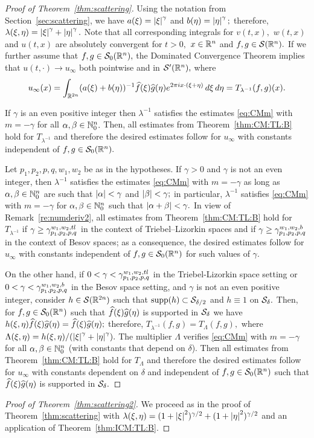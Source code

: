  
 \begin{proof}[Proof of Theorem~\ref{thm:scattering}] Using the notation from Section~\ref{sec:scattering},  we have $a(\xi)=\left\vert \xi \right\vert^\gamma$ and $b(\eta)=\left\vert \eta \right\vert^\gamma;$ therefore, $\lambda(\xi,\eta)=\left\vert \xi \right\vert^\gamma+\left\vert \eta \right\vert^\gamma.$ Note that all corresponding integrals for $v(t,x),$ $w(t,x)$ and $u(t,x)$ are absolutely convergent for $t>0,$ $x\in{{\mathbb R}^n}$ and $f,g\in {\mathcal{S}}({{\mathbb R}^n}).$ If we further assume that $f,g\in {\mathcal{S}_0}({{\mathbb R}^n}),$ the Dominated Convergence Theorem implies that $u(t,\cdot)\to u_\infty$  both pointwise and in ${\mathcal{S}'}({{\mathbb R}^n}),$ where
$$
u_\infty(x)=\int_{\mathbb{R}^{2n}} (a(\xi)+b(\eta))^{-1}\widehat{f}(\xi)\widehat{g}(\eta)e^{2\pi i x \cdot (\xi + \eta)}\, d\xi\, d\eta=T_{\lambda^{-1}} (f,g)(x).
$$

If $\gamma$ is an even positive integer then $\lambda^{-1}$ satisfies the estimates \eqref{eq:CMm} with $m=-\gamma$ for all $\alpha,\beta\in\mathbb{N}_0^n.$ Then,  all estimates from Theorem~\ref{thm:CM:TL:B} hold for $T_{\lambda^{-1}}$  and therefore the desired estimates follow for $u_\infty$ with constants independent of $f,g\in{\mathcal{S}_0}({{\mathbb R}^n}).$ 

Let $p_1,p_2,p,q, w_1,w_2$ be as in the hypotheses.  If $\gamma>0$ and $\gamma$ is not an even integer, then $\lambda^{-1}$ satisfies the estimates \eqref{eq:CMm} with $m=-\gamma$ as long as  $\alpha,\beta\in\mathbb{N}_0^n$ are such that $\left\vert \alpha \right\vert<\gamma$ and $\left\vert \beta \right\vert<\gamma;$ in particular, $\lambda^{-1}$ satisfies \eqref{eq:CMm} with $m=-\gamma$ for $\alpha,\beta\in \mathbb{N}_0^n$ such that $\left\vert \alpha+\beta \right\vert<\gamma.$
In view of Remark~\ref{re:numderiv2}, all estimates from Theorem~\ref{thm:CM:TL:B} hold for $T_{\lambda^{-1}}$ if $\gamma\ge \gamma_{p_1,p_2,p,q}^{w_1,w_2, tl}$ in the context of Triebel--Lizorkin spaces and if $\gamma\ge \gamma_{p_1,p_2,p,q}^{w_1,w_2,b}$ in the context of Besov spaces; as a consequence, the desired estimates follow for $u_\infty$ with constants independent of $f,g\in{\mathcal{S}_0}({{\mathbb R}^n})$ for such values of $\gamma.$


On the other hand, if $0<\gamma<\gamma_{p_1,p_2,p,q}^{w_1,w_2, tl}$ in the Triebel-Lizorkin space setting or $0<\gamma<\gamma_{p_1,p_2,p,q}^{w_1,w_2,b}$ in the Besov space setting, and $\gamma$ is not an even positive integer, consider  $h\in\mathcal{S}(\mathbb{R}^{2n}) $ such that ${\rm{supp}}(h)\subset \mathcal{S}_{\delta/2}$ and $h\equiv 1$ on $\mathcal{S}_{\delta}.$ Then, for $f,g\in {\mathcal{S}_0}({{\mathbb R}^n})$ such that $\widehat{f}(\xi)\widehat{g}(\eta)$ is supported in $\mathcal{S}_{\delta}$ we have $h(\xi,\eta)\widehat{f}(\xi)\widehat{g}(\eta)=\widehat{f}(\xi)\widehat{g}(\eta);$   therefore, $T_{\lambda^{-1}}(f,g)=T_{\Lambda}(f,g),$ where
$\Lambda(\xi,\eta)=h(\xi,\eta)/(\left\vert \xi \right\vert^\gamma+\left\vert \eta \right\vert^\gamma).$ The multiplier $\Lambda$ verifies  \eqref{eq:CMm} with $m=-\gamma$  for all $\alpha,\beta\in\mathbb{N}_0^n$ (with constants that depend on $\delta$). Then all estimates from Theorem~\ref{thm:CM:TL:B} hold for $T_\Lambda$ and therefore the desired estimates follow for $u_\infty$ with constants dependent on $\delta$ and independent of $f,g\in{\mathcal{S}_0}({{\mathbb R}^n})$ such that  $\widehat{f}(\xi)\widehat{g}(\eta)$ is supported in $\mathcal{S}_{\delta}.$
\end{proof}

\begin{proof}[Proof of Theorem~\ref{thm:scattering2}] We proceed as in the proof of Theorem~\ref{thm:scattering} with $\lambda(\xi,\eta)=(1+\left\vert \xi \right\vert^2)^{\gamma /2}+(1+\left\vert \eta \right\vert^2)^{\gamma /2}$ and an application of  Theorem~\ref{thm:ICM:TL:B}.  
\end{proof}  